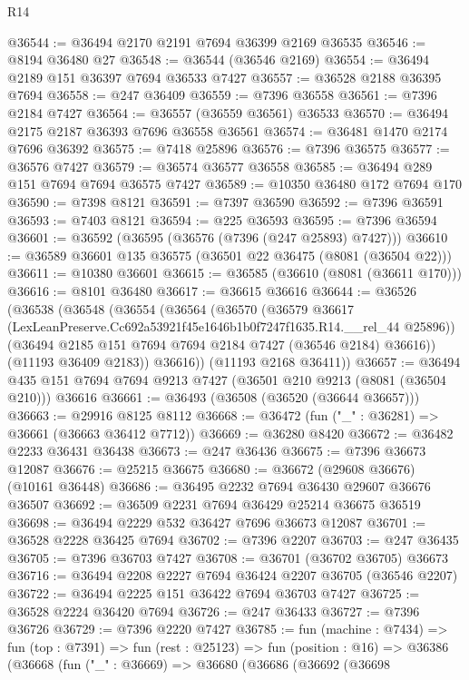 \begin{lexlean}{R14}
\begin{coremodule}
@36544 := @36494 @2170 @2191 @7694 @36399 @2169 @36535
@36546 := @8194 @36480 @27
@36548 := @36544 (@36546 @2169)
@36554 := @36494 @2189 @151 @36397 @7694 @36533 @7427
@36557 := @36528 @2188 @36395 @7694
@36558 := @247 @36409
@36559 := @7396 @36558
@36561 := @7396 @2184 @7427
@36564 := @36557 (@36559 @36561) @36533
@36570 := @36494 @2175 @2187 @36393 @7696 @36558 @36561
@36574 := @36481 @1470 @2174 @7696 @36392
@36575 := @7418 @25896
@36576 := @7396 @36575
@36577 := @36576 @7427
@36579 := @36574 @36577 @36558
@36585 := @36494 @289 @151 @7694 @7694 @36575 @7427
@36589 := @10350 @36480 @172 @7694 @170
@36590 := @7398 @8121
@36591 := @7397 @36590
@36592 := @7396 @36591
@36593 := @7403 @8121
@36594 := @225 @36593
@36595 := @7396 @36594
@36601 := @36592 (@36595 (@36576 (@7396 (@247 @25893) @7427)))
@36610 := @36589 @36601 @135 @36575 (@36501 @22 @36475 (@8081 (@36504 @22)))
@36611 := @10380 @36601
@36615 := @36585 (@36610 (@8081 (@36611 @170)))
@36616 := @8101 @36480
@36617 := @36615 @36616
@36644 := @36526
    (@36538
      (@36548
        (@36554
          (@36564
            (@36570
              (@36579
                @36617
                (LexLeanPreserve.Cc692a53921f45e1646b1b0f7247f1635.R14.__rel_44 @25896))
              (@36494 @2185 @151 @7694 @7694 @2184 @7427 (@36546 @2184) @36616))
            (@11193 @36409 @2183))
          @36616))
      (@11193 @2168 @36411))
@36657 := @36494 @435 @151 @7694 @7694 @9213 @7427 (@36501 @210 @9213 (@8081 (@36504 @210))) @36616
@36661 := @36493 (@36508 (@36520 (@36644 @36657)))
@36663 := @29916 @8125 @8112
@36668 := @36472 (fun ("_" : @36281) => @36661 (@36663 @36412 @7712))
@36669 := @36280 @8420
@36672 := @36482 @2233 @36431 @36438
@36673 := @247 @36436
@36675 := @7396 @36673 @12087
@36676 := @25215 @36675
@36680 := @36672 (@29608 @36676) (@10161 @36448)
@36686 := @36495 @2232 @7694 @36430 @29607 @36676 @36507
@36692 := @36509 @2231 @7694 @36429 @25214 @36675 @36519
@36698 := @36494 @2229 @532 @36427 @7696 @36673 @12087
@36701 := @36528 @2228 @36425 @7694
@36702 := @7396 @2207
@36703 := @247 @36435
@36705 := @7396 @36703 @7427
@36708 := @36701 (@36702 @36705) @36673
@36716 := @36494 @2208 @2227 @7694 @36424 @2207 @36705 (@36546 @2207)
@36722 := @36494 @2225 @151 @36422 @7694 @36703 @7427
@36725 := @36528 @2224 @36420 @7694
@36726 := @247 @36433
@36727 := @7396 @36726
@36729 := @7396 @2220 @7427
@36785 := fun (machine : @7434) =>
  fun (top : @7391) =>
  fun (rest : @25123) =>
  fun (position : @16) =>
  @36386
    (@36668
      (fun ("_" : @36669) =>
      @36680
        (@36686
          (@36692
            (@36698

\end{coremodule}
\end{lexlean}
